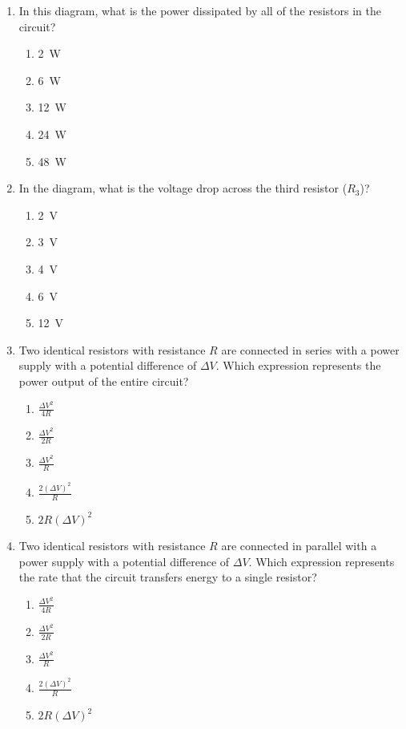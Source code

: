 \documentclass{../../../oss-classkick}
\begin{document}
\begin{multicols*}{2}
\begin{enumerate}[leftmargin=18pt]
  \item In this diagram, what is the power dissipated by all of the resistors in
    the circuit?
    \begin{enumerate}[nosep,leftmargin=18pt,label=(\Alph*)]  
    \item\SI{2}{W}
    \item\SI{6}{W}
    \item\SI{12}{W}
    \item\SI{24}{W}
    \item\SI{48}{W}
    \end{enumerate}
  
  \item In the diagram, what is the voltage drop across the third resistor
    ($R_3$)?
    \begin{enumerate}[noitemsep,topsep=0pt,leftmargin=18pt,label=(\Alph*)]  
    \item\SI{2}{V}
    \item\SI{3}{V}
    \item\SI{4}{V}
    \item\SI{6}{V}
    \item\SI{12}{V}
    \end{enumerate}
    \label{series4}
    \columnbreak
    
  \item Two identical resistors with resistance $R$ are connected in series
    with a power supply with a potential difference of $\Delta V$. Which
    expression represents the power output of the entire circuit?
    \begin{enumerate}[nosep,leftmargin=18pt,label=(\Alph*)]
    \item $\displaystyle\frac{\Delta V^2}{4R}$
    \item $\displaystyle\frac{\Delta V^2}{2R}$
    \item $\displaystyle\frac{\Delta V^2}{R}$
    \item $\displaystyle\frac{2(\Delta V)^2}{R}$
    \item $2R(\Delta V)^2$
    \end{enumerate}

  \item Two identical resistors with resistance $R$ are connected in parallel
    with a power supply with a potential difference of $\Delta V$. Which
    expression represents the rate that the circuit transfers energy to a
    single resistor?
    \begin{enumerate}[nosep,leftmargin=18pt,label=(\Alph*)]
    \item $\displaystyle\frac{\Delta V^2}{4R}$
    \item $\displaystyle\frac{\Delta V^2}{2R}$
    \item $\displaystyle\frac{\Delta V^2}{R}$
    \item $\displaystyle\frac{2(\Delta V)^2}{R}$
    \item $2R(\Delta V)^2$
    \end{enumerate}
  \end{enumerate}


\end{multicols*}
\end{document}
